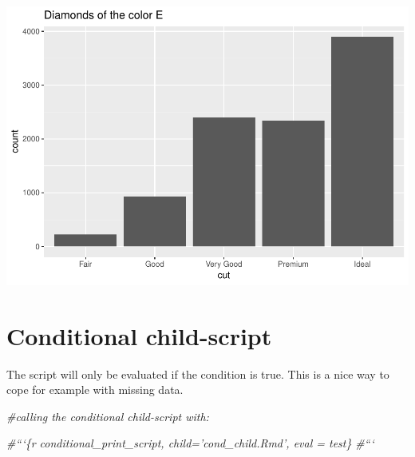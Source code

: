 \documentclass[12pt,]{article}
\newenvironment{Shaded}{\begin{snugshade}}{\end{snugshade}}
\newcommand{\KeywordTok}[1]{\textcolor[rgb]{0.13,0.29,0.53}{\textbf{#1}}}
\newcommand{\DecValTok}[1]{\textcolor[rgb]{0.00,0.00,0.81}{#1}}
\newcommand{\StringTok}[1]{\textcolor[rgb]{0.31,0.60,0.02}{#1}}
\newcommand{\CommentTok}[1]{\textcolor[rgb]{0.56,0.35,0.01}{\textit{#1}}}
\newcommand{\OtherTok}[1]{\textcolor[rgb]{0.56,0.35,0.01}{#1}}
\newcommand{\OperatorTok}[1]{\textcolor[rgb]{0.81,0.36,0.00}{\textbf{#1}}}
\newcommand{\NormalTok}[1]{#1}
\begin{document}
\includegraphics{SatRDay_Example_automatedReports_files/figure-latex/unnamed-chunk-3-1.pdf}

\section{Conditional child-script}\label{conditional-child-script}

The script will only be evaluated if the condition is true. This is a
nice way to cope for example with missing data.

\begin{Shaded}
\end{Shaded}

\begin{Shaded}
\begin{Highlighting}[]
\CommentTok{#calling the conditional child-script with: }

\CommentTok{#```\{r conditional_print_script, child='cond_child.Rmd', eval = test\}}
\CommentTok{#```}
\end{Highlighting}
\end{Shaded}
\end{document}
